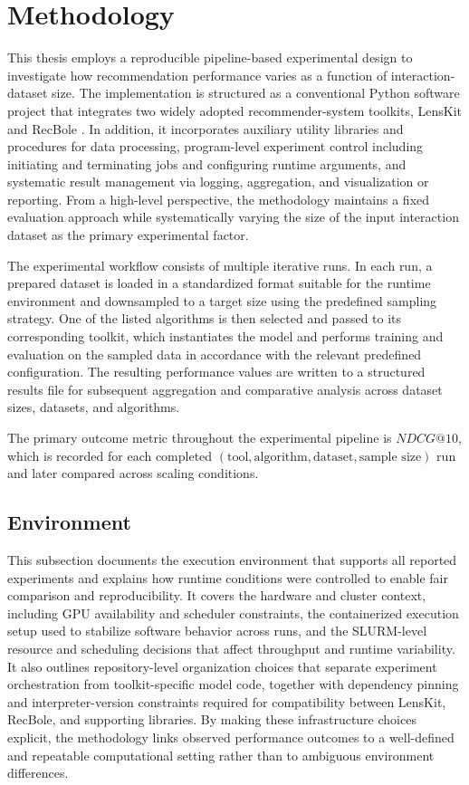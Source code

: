 \documentclass[12pt,a4paper]{article}
\begin{document}
\section{Methodology}
This thesis employs a reproducible pipeline-based experimental design to investigate how recommendation performance varies as a function of interaction-dataset size. The implementation is structured as a conventional Python software project that integrates two widely adopted recommender-system toolkits, LensKit \cite{lenskit} and RecBole \cite{recbole}. In addition, it incorporates auxiliary utility libraries and procedures for data processing, program-level experiment control including initiating and terminating jobs and configuring runtime arguments, and systematic result management via logging, aggregation, and visualization or reporting. From a high-level perspective, the methodology maintains a fixed evaluation approach while systematically varying the size of the input interaction dataset as the primary experimental factor.

The experimental workflow consists of multiple iterative runs. In each run, a prepared dataset is loaded in a standardized format suitable for the runtime environment and downsampled to a target size using the predefined sampling strategy. One of the listed algorithms is then selected and passed to its corresponding toolkit, which instantiates the model and performs training and evaluation on the sampled data in accordance with the relevant predefined configuration. The resulting performance values are written to a structured results file for subsequent aggregation and comparative analysis across dataset sizes, datasets, and algorithms.

The primary outcome metric throughout the experimental pipeline is $NDCG@10$, which is recorded for each completed $(\text{tool}, \text{algorithm}, \text{dataset}, \text{sample size})$ run and later compared across scaling conditions.

\subsection{Environment}
This subsection documents the execution environment that supports all reported experiments and explains how runtime conditions were controlled to enable fair comparison and reproducibility. It covers the hardware and cluster context, including GPU availability and scheduler constraints, the containerized execution setup used to stabilize software behavior across runs, and the SLURM-level resource and scheduling decisions that affect throughput and runtime variability. It also outlines repository-level organization choices that separate experiment orchestration from toolkit-specific model code, together with dependency pinning and interpreter-version constraints required for compatibility between LensKit, RecBole, and supporting libraries. By making these infrastructure choices explicit, the methodology links observed performance outcomes to a well-defined and repeatable computational setting rather than to ambiguous environment differences.
\end{document}
